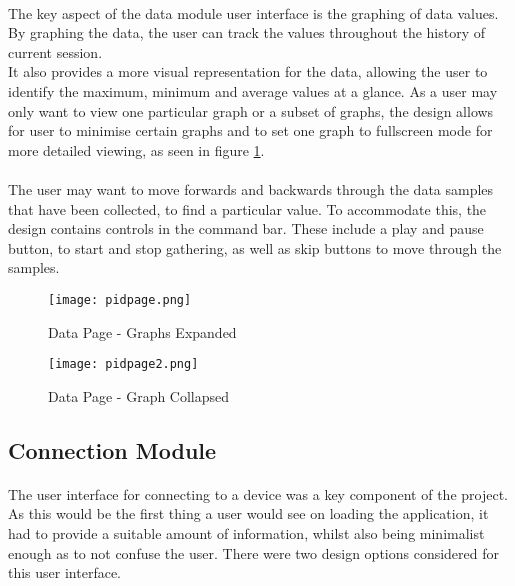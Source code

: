 		\paragraph{}{
		The key aspect of the data module user interface is the graphing of data values. By graphing the data, the user can track the values throughout the history of current session. 
\\		
		It also provides a more visual representation for the data, allowing the user to identify the maximum, minimum and average values at a glance. As a user may only want to view one particular graph or a subset of graphs, the design allows for user to minimise certain graphs and to set one graph to fullscreen mode for more detailed viewing, as seen in figure \ref{fig:DataPage2}.
		}
		\paragraph{}{
		The user may want to move forwards and backwards through the data samples that have been collected, to find a particular value. To accommodate this, the design contains controls in the command bar. These include a play and pause button, to start and stop gathering, as well as skip buttons to move through the samples.
		}
		\begin{figure}[h]
			\begin{center}								
				\begin{minipage}{0.49\textwidth}
					\texttt{[image: pidpage.png]}
					\caption{Data Page - Graphs Expanded}						
					\label{fig:DataPage1}
				\end{minipage}
				\hfill			
				\begin{minipage}{0.49\textwidth}
					\texttt{[image: pidpage2.png]}
					\caption{Data Page - Graph Collapsed}						
					\label{fig:DataPage2}
				\end{minipage}									
			\end{center}
		\end{figure}
	
	\newpage
	\subsection{Connection Module}
		\paragraph{}{
		The user interface for connecting to a device was a key component of the project. As this would be the first thing a user would see on loading the application, it had to provide a suitable amount of information, whilst also being minimalist enough as to not confuse the user. There were two design options considered for this user interface. 
		}

